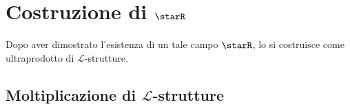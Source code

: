 
\section{Costruzione di $\starR$}

Dopo aver dimostrato l'esistenza di un tale campo $ \starR $, lo si costruisce come ultraprodotto di $ \mathcal{L}$-strutture.

\subsection{Moltiplicazione di $ \mathcal{L} $-strutture}

